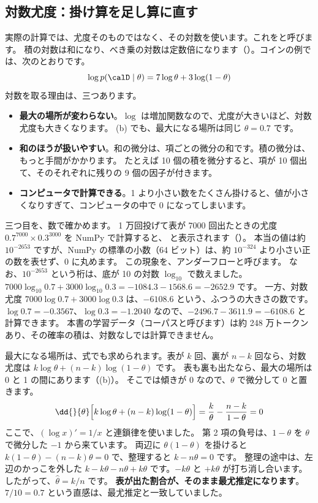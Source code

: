 \subsection*{対数尤度：掛け算を足し算に直す}

実際の計算では、尤度そのものではなく、その対数を使います。これをと呼びます。
積の対数は和になり、べき乗の対数は定数倍になります（）。コインの例では、次のとおりです。
\begin{equation}
\log p(\calD\mid\theta)=7\log\theta+3\log(1-\theta)
\label{eq:math-loglik}
\end{equation}
対数を取る理由は、三つあります。
\begin{itemize}
\item \textbf{最大の場所が変わらない}。$\log$ は増加関数なので、尤度が大きいほど、対数尤度も大きくなります。
  (b) でも、最大になる場所は同じ $\theta=0.7$ です。
\item \textbf{和のほうが扱いやすい}。和の微分は、項ごとの微分の和です。積の微分は、もっと手間がかかります。
  たとえば 10 個の積を微分すると、項が 10 個出て、そのそれぞれに残りの 9 個の因子が付きます。
\item \textbf{コンピュータで計算できる}。1 より小さい数をたくさん掛けると、値が小さくなりすぎて、コンピュータの中で 0 になってしまいます。
\end{itemize}
三つ目を、数で確かめます。
1 万回投げて表が 7000 回出たときの尤度 $0.7^{7000}\times 0.3^{3000}$ を NumPy で計算すると、 と表示されます（）。
本当の値は約 $10^{-2653}$ ですが、NumPy の標準の小数（64 ビット）は、約 $10^{-324}$ より小さい正の数を表せず、0 に丸めます。
この現象を、アンダーフローと呼びます。
なお、$10^{-2653}$ という桁は、底が 10 の対数 $\log_{10}$ で数えました。$7000\log_{10}0.7+3000\log_{10}0.3=-1084.3-1568.6=-2652.9$ です。
一方、対数尤度 $7000\log 0.7+3000\log 0.3$ は、$-6108.6$ という、ふつうの大きさの数です。
$\log 0.7=-0.3567$、$\log 0.3=-1.2040$ なので、$-2496.7-3611.9=-6108.6$ と計算できます。
本書の学習データ（コーパスと呼びます）は約 248 万トークンあり、その確率の積は、対数なしでは計算できません。

最大になる場所は、式でも求められます。表が $k$ 回、裏が $n-k$ 回なら、対数尤度は $k\log\theta+(n-k)\log(1-\theta)$ です。
表も裏も出たなら、最大の場所は 0 と 1 の間にあります（(b)）。
そこでは傾きが 0 なので、$\theta$ で微分して 0 と置きます。
\begin{equation}
\dd{}{\theta}\Bigl[k\log\theta+(n-k)\log(1-\theta)\Bigr]=\frac{k}{\theta}-\frac{n-k}{1-\theta}=0
\label{eq:math-coin-derivative}
\end{equation}
ここで、$(\log x)'=1/x$ と連鎖律を使いました。
第 2 項の負号は、$1-\theta$ を $\theta$ で微分した $-1$ から来ています。
両辺に $\theta(1-\theta)$ を掛けると $k(1-\theta)-(n-k)\theta=0$ で、整理すると $k-n\theta=0$ です。
整理の途中は、左辺のかっこを外した $k-k\theta-n\theta+k\theta$ です。$-k\theta$ と $+k\theta$ が打ち消し合います。
したがって、$\hat\theta=k/n$ です。
\textbf{表が出た割合が、そのまま最尤推定になります}。$7/10=0.7$ という直感は、最尤推定と一致していました。

